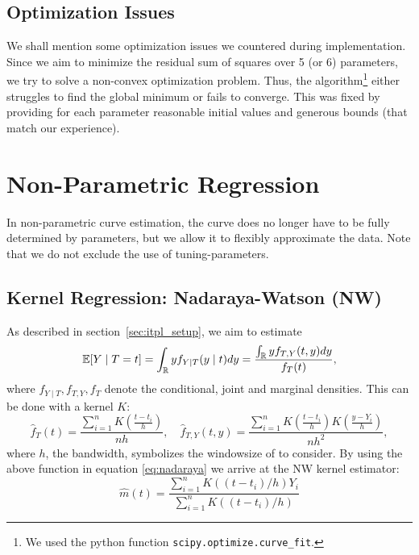 	\subsection{Optimization Issues}\label{sec:itpl_param_optimizationissues}
		We shall mention some optimization issues we countered during implementation. Since we aim to minimize the residual sum of squares over 5 (or 6) parameters, we try to solve a non-convex optimization problem. Thus, the algorithm\footnote{We used the python function \texttt{scipy.optimize.curve\_fit}.} either struggles to find the global minimum or fails to converge. This was fixed by providing for each parameter reasonable initial values and generous bounds (that match our experience).

\section{Non-Parametric Regression}
	\label{sec:itpl_nonparametric}
	In non-parametric curve estimation, the curve does no longer have to be fully determined by parameters, but we allow it to flexibly approximate the data. Note that we do not exclude the use of tuning-parameters.

	\subsection{Kernel Regression: Nadaraya-Watson (NW)}
		\label{sec:Kernel}
		As described in section~\ref{sec:itpl_setup}, we aim to estimate
		\begin{equation}
			\label{eq:nadaraya}
			\mathbb{E}[Y \mid T=t]
			= \int_{\mathbb{R}} y f_{Y \mid T}(y \mid t) d y
			=\frac{\int_{\mathbb{R}} y f_{T, Y}(t, y) d y}{f_{T}(t)},
		\end{equation}
		where $f_{Y \mid T}, f_{T, Y}, f_{T}$ denote the conditional, joint and marginal densities.
		This can be done with a kernel $K$:
		\begin{equation}
			\hat{f}_{T}(t)=\frac{\sum_{i=1}^{n} K\left(\frac{t-t_{i}}{h}\right)}{n h}, \quad \hat{f}_{T, Y}(t, y)=\frac{\sum_{i=1}^{n} K\left(\frac{t-t_{i}}{h}\right) K\left(\frac{y-Y_{i}}{h}\right)}{n h^{2}},
			\label{eq:kernel_with_bandwidt}
		\end{equation}
		where $h$, the bandwidth, symbolizes the windowsize of to consider. By using the above function in equation \eqref{eq:nadaraya} we arrive at the NW kernel estimator:
		$$\hat{m}(t)=\frac{\sum_{i=1}^{n} K\left(\left(t-t_{i}\right) / h\right) Y_{i}}{\sum_{i=1}^{n} K\left(\left(t-t_{i}\right) / h\right)}$$

